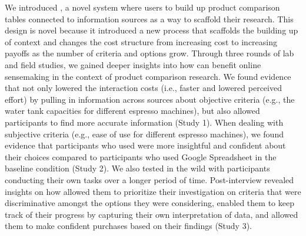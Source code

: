 
We introduced \SYSTEM, a novel system where users to build up product comparison tables connected to information sources as a way to scaffold their research. This design is novel because it introduced a new process that scaffolds the building up of context and changes the cost structure from increasing cost to increasing payoffs as the number of criteria and options grow. Through three rounds of lab and field studies, we gained deeper insights into how \SYSTEM can benefit online sensemaking in the context of product comparison research. We found evidence that \SYSTEM not only lowered the interaction costs (i.e., faster and lowered perceived effort) by pulling in information across sources about objective criteria (e.g., the water tank capacities for different espresso machines), but also allowed participants to find more accurate information (Study 1). When dealing with subjective criteria (e.g., ease of use for different espresso machines), we found evidence that participants who used \SYSTEM were more insightful and confident about their choices compared to participants who used Google Spreadsheet in the baseline condition (Study 2).  We also tested \SYSTEM in the wild with participants conducting their own tasks over a longer period of time. Post-interview revealed insights on how \SYSTEM allowed them to prioritize their investigation on criteria that were discriminative amongst the options they were considering, enabled them to keep track of their progress by capturing their own interpretation of data, and allowed them to make confident purchases based on their findings (Study 3). 





\balance{}
